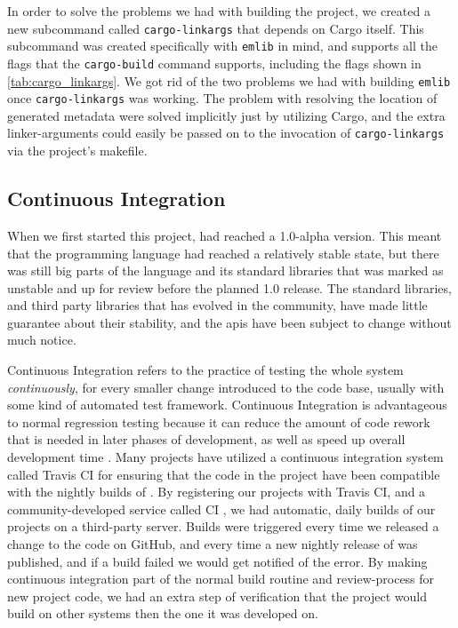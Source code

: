 In order to solve the problems we had with building the project, we created a new subcommand called \texttt{cargo-linkargs} \cite{github:cargo_linkargs} that depends on Cargo itself.
This subcommand was created specifically with \texttt{emlib} in mind, and supports all the flags that the \texttt{cargo-build} command supports, including the flags shown in \autoref{tab:cargo_linkargs}.
We got rid of the two problems we had with building \texttt{emlib} once \texttt{cargo-linkargs} was working.
The problem with resolving the location of generated metadata were solved implicitly just by utilizing Cargo, and the extra linker-arguments could easily be passed on to the invocation of \texttt{cargo-linkargs} via the project's makefile.

\subsection{Continuous Integration}
\label{ssub:continuous_integration}

When we first started this project, \rust had reached a 1.0-alpha version.
This meant that the programming language had reached a relatively stable state, but there was still big parts of the language and its standard libraries that was marked as unstable and up for review before the planned 1.0 release.
The standard libraries, and third party \rust libraries that has evolved in the \rust community, have made little guarantee about their stability, and the \glspl{api} have been subject to change without much notice.

Continuous Integration refers to the practice of testing the whole system \emph{continuously}, for every smaller change introduced to the code base, usually with some kind of automated test framework.
Continuous Integration is advantageous to normal regression testing because it can reduce the amount of code rework that is needed in later phases of development, as well as speed up overall development time  \cite{Orso2014}.
Many \rust projects have utilized a continuous integration system called Travis CI \cite{web:travis_ci} for ensuring that the code in the project have been compatible with the nightly builds of \rust.
By registering our projects with Travis CI, and a community-developed service called \rust CI \cite{web:rust_ci}, we had automatic, daily builds of our projects on a third-party server.
Builds were triggered every time we released a change to the code on GitHub, and every time a new nightly release of \rust was published, and if a build failed we would get notified of the error.
By making continuous integration part of the normal build routine and review-process for new project code, we had an extra step of verification that the project would build on other systems then the one it was developed on.

